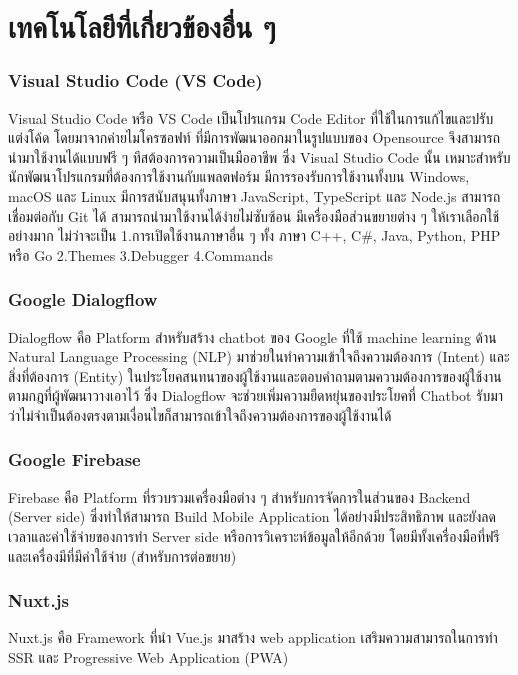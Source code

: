 \section{เทคโนโลยีที่เกี่ยวข้องอื่น ๆ}

\subsubsection{Visual Studio Code (VS Code)}
\quad Visual Studio Code หรือ VS Code เป็นโปรแกรม Code Editor ที่ใช้ในการแก้ไขและปรับแต่งโค้ด โดยมาจากค่ายไมโครซอฟท์ ที่มีการพัฒนาออกมาในรูปแบบของ Opensource จึงสามารถนำมาใช้งานได้แบบฟรี ๆ ทีสต้องการความเป็นมืออาชีพ ซึ่ง Visual Studio Code นั้น เหมาะสำหรับนักพัฒนาโปรแกรมที่ต้องการใช้งานกับแพลตฟอร์ม มีการรองรับการใช้งานทั้งบน Windows, macOS และ Linux มีการสนับสนุนทั้งภาษา  JavaScript, TypeScript และ Node.js สามารถเชื่อมต่อกับ  Git ได้ สามารถนำมาใช้งานได้ง่ายไม่ซับซ้อน มีเครื่องมือส่วนขยายต่าง ๆ ให้เราเลือกใช้อย่างมาก ไม่ว่าจะเป็น 1.การเปิดใช้งานภาษาอื่น ๆ ทั้ง ภาษา  C++,  C\#, Java, Python, PHP หรือ Go  2.Themes 3.Debugger 4.Commands 
\cite{vscode}
\subsubsection{Google Dialogflow} 
\quad Dialogflow คือ Platform สำหรับสร้าง chatbot ของ Google ที่ใช้ machine learning ด้าน Natural Language Processing (NLP) มาช่วยในทำความเข้าใจถึงความต้องการ (Intent) และสิ่งที่ต้องการ (Entity) ในประโยคสนทนาของผู้ใช้งานและตอบคำถามตามความต้องการของผู้ใช้งาน ตามกฎที่ผู้พัฒนาวางเอาไว้ ซึ่ง Dialogflow จะช่วยเพิ่มความยืดหยุ่นของประโยคที่ Chatbot รับมา ว่าไม่จำเป็นต้องตรงตามเงื่อนไขก็สามารถเข้าใจถึงความต้องการของผู้ใช้งานได้ 
\cite{lineDf}
\subsubsection{Google Firebase} 
\quad Firebase คือ Platform ที่รวบรวมเครื่องมือต่าง ๆ สำหรับการจัดการในส่วนของ Backend (Server side) ซึ่งทำให้สามารถ Build Mobile Application ได้อย่างมีประสิทธิภาพ และยังลดเวลาและค่าใช้จ่ายของการทำ Server side หรือการวิเคราะห์ข้อมูลให้อีกด้วย โดยมีทั้งเครื่องมือที่ฟรี และเครื่องมีที่มีค่าใช้จ่าย (สำหรับการต่อขยาย) 
\cite{firebase}
\subsubsection{Nuxt.js }
\quad Nuxt.js คือ Framework ที่นำ Vue.js มาสร้าง web application เสริมความสามารถในการทำ SSR และ Progressive Web Application (PWA) 
\cite{nuxt}

